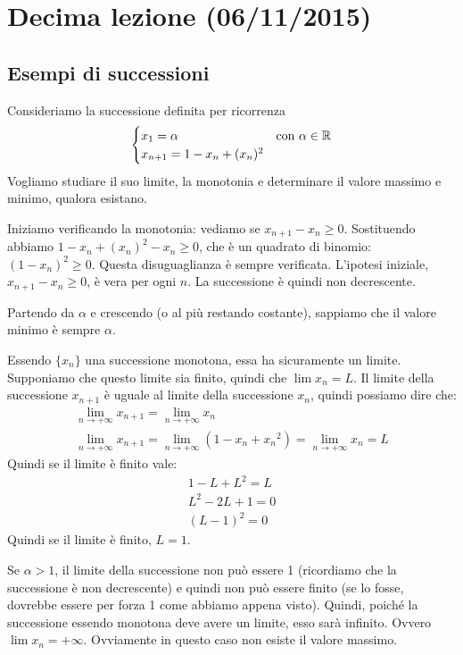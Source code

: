 \chapter{Decima lezione (06/11/2015)}

\section{Esempi di successioni}
\begin{example}
Consideriamo la successione definita per ricorrenza
\begin{equation*}
\begin{cases}
x_1 = \alpha & \mbox{con } \alpha \in \mathbb R \\
x_{n+1} = 1 - x_n + (x_n)^2
\end{cases}
\end{equation*}
Vogliamo studiare il suo limite, la monotonia e determinare il valore massimo e minimo, qualora esistano.

Iniziamo verificando la monotonia: vediamo se $x_{n+1} - x_n \ge 0$. Sostituendo abbiamo $1 - x_n + (x_n)^2 - x_n \ge 0$, che è un quadrato di binomio: $(1-x_n)^2 \ge 0$. Questa disuguaglianza è sempre verificata. L'ipotesi iniziale, $x_{n+1} - x_n \ge 0$, è vera per ogni $n$. La successione è quindi non decrescente.

Partendo da $\alpha$ e crescendo (o al più restando costante), sappiamo che il valore minimo è sempre $\alpha$.

Essendo $\{x_n\}$ una successione monotona, essa ha sicuramente un limite. Supponiamo che questo limite sia finito, quindi che $\lim x_n = L$.
Il limite della successione $x_{n+1}$ è uguale al limite della successione $x_n$, quindi possiamo dire che:
\begin{gather*}
\lim_{n \to +\infty} x_{n+1} = \lim_{n \to +\infty} x_n \\
\lim_{n \to +\infty} x_{n+1} = \lim_{n \to +\infty} (1 - x_n + {x_n}^2) = \lim_{n \to +\infty} x_n = L 
\end{gather*}
Quindi se il limite è finito vale:
\begin{gather*}
1 - L + L^2 = L \\
L^2 - 2L + 1 = 0 \\
(L-1)^2 = 0
\end{gather*}
Quindi se il limite è finito, $L = 1$.

Se $\alpha > 1$, il limite della successione non può essere 1 (ricordiamo che la successione è non decrescente) e quindi non può essere finito (se lo fosse, dovrebbe essere per forza 1 come abbiamo appena visto). Quindi, poiché la successione essendo monotona deve avere un limite, esso sarà infinito. Ovvero $\lim x_n = +\infty$. Ovviamente in questo caso non esiste il valore massimo.


\end{example}
